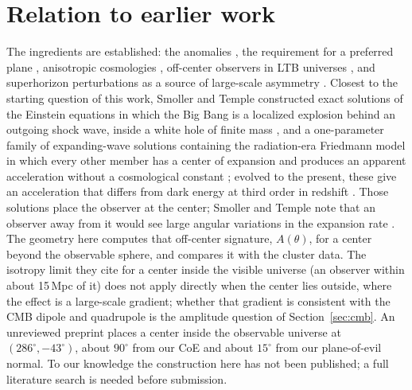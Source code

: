 \documentclass[11pt,a4paper]{article}
\newcommand{\dg}{^\circ}
\begin{document}
\section{Relation to earlier work}
The ingredients are established: the anomalies \cite{Schwarz04,Copi07,LM05,Secrest21,Migkas20}, the requirement for a preferred plane \cite{RS07}, anisotropic cosmologies \cite{Jaffe05,Planck13XXVI}, off-center observers in LTB universes \cite{Alnes06}, and superhorizon perturbations as a source of large-scale asymmetry \cite{Erickcek08}. Closest to the starting question of this work, Smoller and Temple constructed exact solutions of the Einstein equations in which the Big Bang is a localized explosion behind an outgoing shock wave, inside a white hole of finite mass \cite{ST03}, and a one-parameter family of expanding-wave solutions containing the radiation-era Friedmann model in which every other member has a center of expansion and produces an apparent acceleration without a cosmological constant \cite{ST09}; evolved to the present, these give an acceleration that differs from dark energy at third order in redshift \cite{STV17}. Those solutions place the observer at the center; Smoller and Temple note that an observer away from it would see large angular variations in the expansion rate \cite{ST09}. The geometry here computes that off-center signature, $A(\theta)$, for a center beyond the observable sphere, and compares it with the cluster data. The isotropy limit they cite for a center inside the visible universe (an observer within about 15\,Mpc of it) does not apply directly when the center lies outside, where the effect is a large-scale gradient; whether that gradient is consistent with the CMB dipole and quadrupole is the amplitude question of Section~\ref{sec:cmb}. An unreviewed preprint \cite{Bao23} places a center inside the observable universe at $(286\dg,-43\dg)$, about $90\dg$ from our CoE and about $15\dg$ from our plane-of-evil normal. To our knowledge the construction here has not been published; a full literature search is needed before submission.
\end{document}
